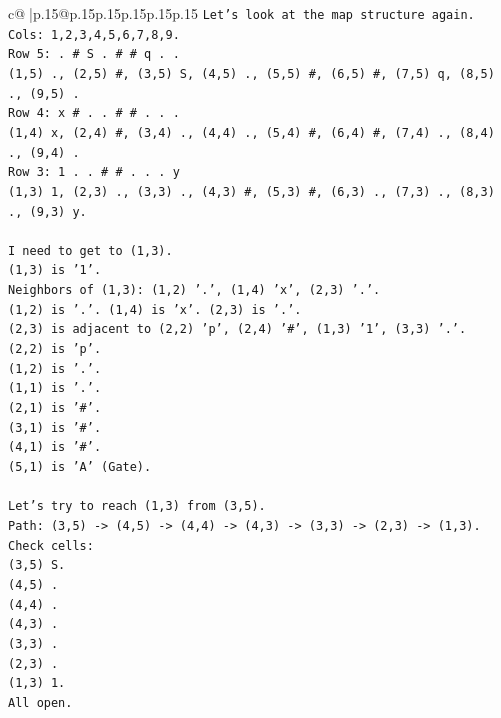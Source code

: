 \documentclass{article}
\begin{document}
{\begin{supertabular}{c@{$\;$}|p{.15\linewidth}@{}p{.15\linewidth}p{.15\linewidth}p{.15\linewidth}p{.15\linewidth}p{.15\linewidth}}
{{{\texttt{Let's look at the map structure again.} \\
\texttt{Cols: 1,2,3,4,5,6,7,8,9.} \\
\texttt{Row 5: . \# S . \# \# q . .} \\
\texttt{(1,5) ., (2,5) \#, (3,5) S, (4,5) ., (5,5) \#, (6,5) \#, (7,5) q, (8,5) ., (9,5) .} \\
\texttt{Row 4: x \# . . \# \# . . .} \\
\texttt{(1,4) x, (2,4) \#, (3,4) ., (4,4) ., (5,4) \#, (6,4) \#, (7,4) ., (8,4) ., (9,4) .} \\
\texttt{Row 3: 1 . . \# \# . . . y} \\
\texttt{(1,3) 1, (2,3) ., (3,3) ., (4,3) \#, (5,3) \#, (6,3) ., (7,3) ., (8,3) ., (9,3) y.} \\
\\ 
\texttt{I need to get to (1,3).} \\
\texttt{(1,3) is '1'.} \\
\texttt{Neighbors of (1,3): (1,2) '.', (1,4) 'x', (2,3) '.'.} \\
\texttt{(1,2) is '.'. (1,4) is 'x'. (2,3) is '.'.} \\
\texttt{(2,3) is adjacent to (2,2) 'p', (2,4) '\#', (1,3) '1', (3,3) '.'.} \\
\texttt{(2,2) is 'p'.} \\
\texttt{(1,2) is '.'.} \\
\texttt{(1,1) is '.'.} \\
\texttt{(2,1) is '\#'.} \\
\texttt{(3,1) is '\#'.} \\
\texttt{(4,1) is '\#'.} \\
\texttt{(5,1) is 'A' (Gate).} \\
\\ 
\texttt{Let's try to reach (1,3) from (3,5).} \\
\texttt{Path: (3,5) {-}> (4,5) {-}> (4,4) {-}> (4,3) {-}> (3,3) {-}> (2,3) {-}> (1,3).} \\
\texttt{Check cells:} \\
\texttt{(3,5) S.} \\
\texttt{(4,5) .} \\
\texttt{(4,4) .} \\
\texttt{(4,3) .} \\
\texttt{(3,3) .} \\
\texttt{(2,3) .} \\
\texttt{(1,3) 1.} \\
\texttt{All open.} \\
}}}
\end{supertabular}}
\end{document}
